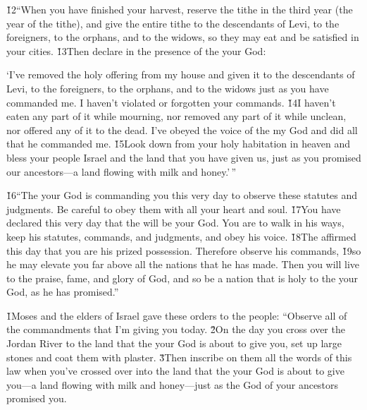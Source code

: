 \v{12}``When you have finished your harvest, reserve the tithe in the third year (the year of the tithe), and give the entire tithe to the descendants of Levi, to the foreigners, to the orphans, and to the widows, so they may eat and be satisfied in your cities. \v{13}Then declare in the presence of the  your God:

\begin{poetry}
\poeml `I've removed the holy offering from my house and given it to the descendants of Levi, to the foreigners, to the orphans, and to the widows just as you have commanded me. I haven't violated or forgotten your commands. \v{14}I haven't eaten any part of it while mourning, nor removed any part of it while unclean, nor offered any of it to the dead. I've obeyed the voice of the  my God and did all that he commanded me. \v{15}Look down from your holy habitation in heaven and bless your people Israel and the land that you have given us, just as you promised our ancestors---a land flowing with milk and honey.'\,''
\end{poetry}

\v{16}``The  your God is commanding you this very day to observe these statutes and judgments. Be careful to obey them with all your heart and soul. \v{17}You have declared this very day that the  will be your God. You are to walk in his ways, keep his statutes, commands, and judgments, and obey his voice. \v{18}The  affirmed this day that you are his prized possession. Therefore observe his commands, \v{19}so he may elevate you far above all the nations that he has made. Then you will live to the praise, fame, and glory of God, and so be a nation that is holy to the  your God, as he has promised.''

\v{1}Moses and the elders of Israel gave these orders to the people: ``Observe all of the commandments that I'm giving you today. \v{2}On the day you cross over the Jordan River to the land that the  your God is about to give you, set up large stones and coat them with plaster. \v{3}Then inscribe on them all the words of this law when you've crossed over into the land that the  your God is about to give you---a land flowing with milk and honey---just as the  God of your ancestors promised you.

